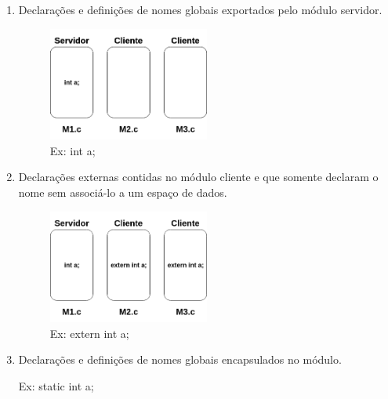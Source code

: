 \documentclass[
	12pt, %
]{fphw}
\begin{document}
\begin{doublespace}
\begin{enumerate}
\begin{enumerate}
                  \item Declarações e definições de nomes globais exportados pelo módulo servidor.

                        \begin{figure}[h]
                            \centering
                            \includegraphics[width=0.5\textwidth]{a.png}
                            \caption*{Ex: int a;}
                        \end{figure}

                  \item Declarações externas contidas no módulo cliente e que somente declaram o nome sem associá-lo a um espaço de dados.

                        \begin{figure}[h]
                            \centering
                            \includegraphics[width=0.5\textwidth]{b.png}
                            \caption*{Ex: extern int a;}
                        \end{figure}

                  \item Declarações e definições de nomes globais encapsulados no módulo.

                        Ex: static int a;

              \end{enumerate}




    \end{enumerate}

\end{doublespace}
\end{document}

